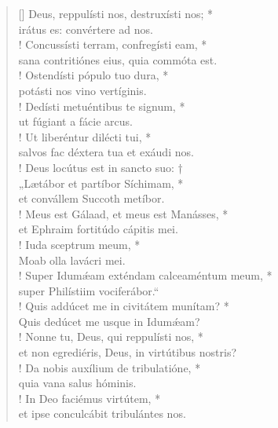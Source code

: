 \begin{verse}[\versewidth]
Deus, reppulísti nos, destruxísti nos; *\\
irátus es: convértere ad nos.\\!
\vin Concussísti terram, confregísti eam, *\\
\vin sana contritiónes eius, quia commóta est.\\!
Ostendísti pópulo tuo dura, *\\
potásti nos vino vertíginis.\\!
\vin Dedísti metuéntibus te signum, *\\
\vin ut fúgiant a fácie arcus.\\!
Ut liberéntur dilécti tui, *\\
salvos fac déxtera tua et exáudi nos.\\!
\vin Deus locútus est in sancto suo: †\\
\vin „Lætábor et partíbor Síchimam, *\\
\vin et convállem Succoth metíbor.\\!
Meus est Gálaad, et meus est Manásses, *\\
et Ephraim fortitúdo cápitis mei.\\!
\vin Iuda sceptrum meum, *\\
\vin Moab olla lavácri mei.\\!
Super Idum\'{æ}am exténdam calceaméntum meum, *\\
super Philístiim vociferábor.“\\!
\vin Quis addúcet me in civitátem munítam? *\\
\vin Quis dedúcet me usque in Idum\'{æ}am?\\!
Nonne tu, Deus, qui reppulísti nos, *\\
et non egrediéris, Deus, in virtútibus nostris?\\!
\vin Da nobis auxílium de tribulatióne, *\\
\vin quia vana salus hóminis.\\!
In Deo faciémus virtútem, *\\
et ipse conculcábit tribulántes nos.\\
\end{verse}
\vspace{1cm}


